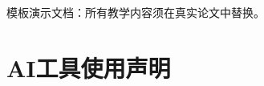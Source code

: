 \documentclass[UTF8,fontset=fandol,zihao=-4]{ctexart}
\begin{document}
\begin{center}
  {\bfseries \papertitle\par}
\end{center}
\ifdraft
\begin{center}\small 模板演示文档：所有教学内容须在真实论文中替换。\end{center}
\fi

\clearpage
\label{page:body-start}






\ifextendedquestions


\fi


\section*{AI工具使用声明}
\aistatement

\label{page:body-end}
\clearpage
\appendix
{}
\renewcommand{\thesubsection}{\Alph{section}.\arabic{subsection}}


\clearpage

\end{document}
